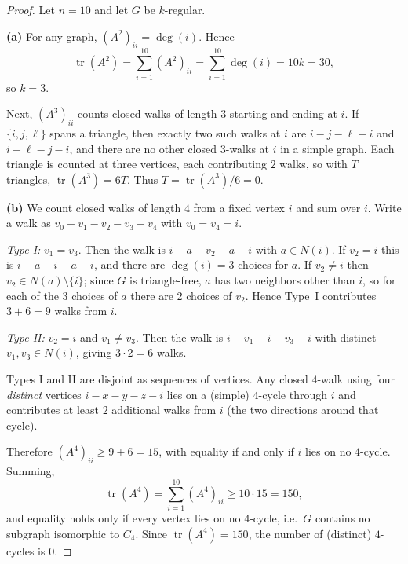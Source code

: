 \documentclass[11pt, a4paper]{ctexrep}
\begin{document}
\begin{proof}
    Let $n=10$ and let $G$ be $k$-regular.

    \smallskip\noindent\textbf{(a)}
    For any graph, $(A^2)_{ii}=\deg(i)$. Hence
    \[
        \operatorname{tr}(A^2)=\sum_{i=1}^{10}(A^2)_{ii}=\sum_{i=1}^{10}\deg(i)=10k=30,
    \]
    so $k=3$.

    Next, $(A^3)_{ii}$ counts closed walks of length $3$ starting and ending at $i$.
    If $\{i,j,\ell\}$ spans a triangle, then exactly two such walks at $i$ are
    $i\!-\!j\!-\!\ell\!-\!i$ and $i\!-\!\ell\!-\!j\!-\!i$, and there are no other
    closed $3$-walks at $i$ in a simple graph. Each triangle is counted at three
    vertices, each contributing $2$ walks, so with $T$ triangles,
    $\operatorname{tr}(A^3)=6T$. Thus $T=\operatorname{tr}(A^3)/6=0$.

    \smallskip\noindent\textbf{(b)}
    We count closed walks of length $4$ from a fixed vertex $i$ and sum over $i$.
    Write a walk as $v_0\!-\!v_1\!-\!v_2\!-\!v_3\!-\!v_4$ with $v_0=v_4=i$.

    \emph{Type I:} $v_1=v_3$. Then the walk is $i\!-\!a\!-\!v_2\!-\!a\!-\!i$ with
    $a\in N(i)$. If $v_2=i$ this is $i\!-\!a\!-\!i\!-\!a\!-\!i$, and there are
    $\deg(i)=3$ choices for $a$. If $v_2\neq i$ then $v_2\in N(a)\setminus\{i\}$;
    since $G$ is triangle-free, $a$ has two neighbors other than $i$, so for each
    of the $3$ choices of $a$ there are $2$ choices of $v_2$. Hence Type~I
    contributes $3+6=9$ walks from $i$.

    \emph{Type II:} $v_2=i$ and $v_1\neq v_3$. Then the walk is
    $i\!-\!v_1\!-\!i\!-\!v_3\!-\!i$ with distinct $v_1,v_3\in N(i)$, giving
    $3\cdot 2=6$ walks.

    Types I and II are disjoint as sequences of vertices. Any closed $4$-walk
    using four \emph{distinct} vertices $i\!-\!x\!-\!y\!-\!z\!-\!i$ lies on a
    (simple) $4$-cycle through $i$ and contributes at least $2$ additional walks
    from $i$ (the two directions around that cycle).

    Therefore $(A^4)_{ii}\ge 9+6=15$, with equality if and only if $i$ lies on
    no $4$-cycle. Summing,
    \[
        \operatorname{tr}(A^4)=\sum_{i=1}^{10}(A^4)_{ii}\ge 10\cdot 15=150,
    \]
    and equality holds only if every vertex lies on no $4$-cycle, i.e.\ $G$
    contains no subgraph isomorphic to $C_4$. Since $\operatorname{tr}(A^4)=150$,
    the number of (distinct) $4$-cycles is $0$.
\end{proof}
\end{document}
